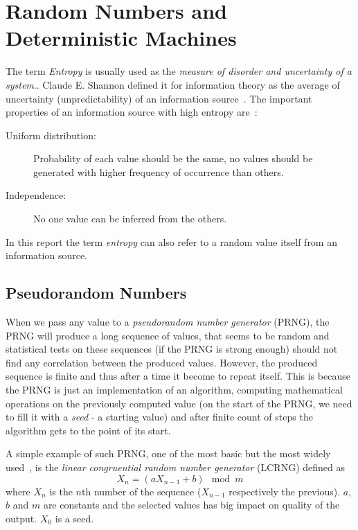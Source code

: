 \chapter{Random Numbers and Deterministic Machines}\label{chap:randomNumbers}
\par{
The term {\em Entropy} is usually used  as the {\em measure of disorder 
and uncertainty of a system}.\cite{Entrophy}. Claude E. Shannon defined it 
for information theory as the average of uncertainty (unpredictability) 
of an information source~\cite[p.~396]{AMathematicalTheoryOfCommunication}. 
The important properties of an information source with high entropy 
are~\cite[p.~150]{CryptographyAndNetworkSecurity}: 
\begin{description}
 \item [Uniform distribution:] Probability of each value should be the same, 
 no values should be generated with higher frequency of occurrence than others.
 \item [Independence:] No one value can be inferred from the others.
\end{description}
}

\par{
In this report the term {\em entropy} can also refer to a random value itself 
from an information source. 
}

\par{
\section{Pseudorandom Numbers}
When we pass any value to a {\em pseudorandom number generator} (PRNG), 
the PRNG will produce a long sequence of values, that seems to be random 
and statistical tests on these sequences (if the PRNG is strong enough) 
should not find any correlation between the produced values. However, 
the produced sequence is finite and thus after a time it become to repeat itself. 
This is because the PRNG is just an implementation of an algorithm, computing 
mathematical operations on the previously computed value (on the start 
of the PRNG, we need to fill it with a {\em seed} - a starting value) 
and after finite count of steps the algorithm gets to the point of its start.
}

\par{
A simple example of such PRNG, one of the most basic but the most widely 
used~\cite[p.~151]{CryptographyAndNetworkSecurity}, 
is the {\em linear congruential random number generator} (LCRNG) defined as 
\begin{equation}\label{eq:LCRNG}
  X_n = (aX_{n-1} + b) \mod{m}
\end{equation}
where $X_n$ is the $n$th number of the sequence ($X_{n-1}$ respectively 
the previous). $a$, $b$ and $m$ are constants and the selected values 
has big impact on quality of the output. $X_0$ is a seed. 
}

